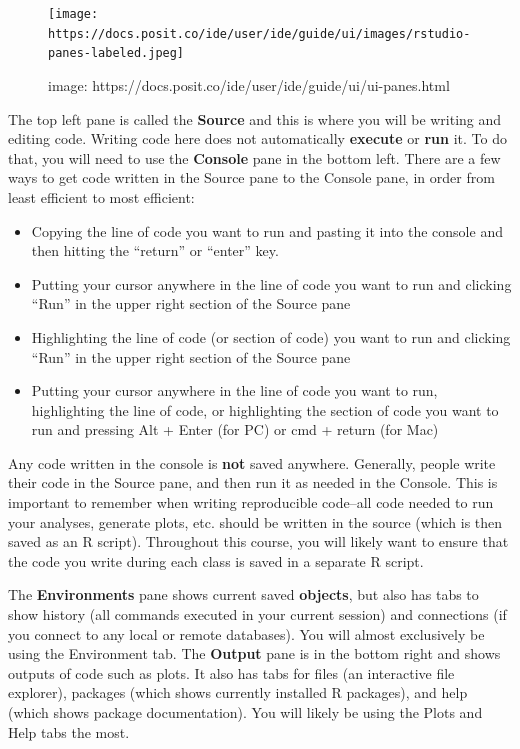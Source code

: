 \documentclass[
  letterpaper,
  DIV=11,
  numbers=noendperiod]{scrreprt}
\begin{document}
\begin{figure}

{\centering \texttt{[image: https://docs.posit.co/ide/user/ide/guide/ui/images/rstudio-panes-labeled.jpeg]}

}

\caption{image:
https://docs.posit.co/ide/user/ide/guide/ui/ui-panes.html}

\end{figure}

The top left pane is called the \textbf{Source} and this is where you
will be writing and editing code. Writing code here does not
automatically \textbf{execute} or \textbf{run} it. To do that, you will
need to use the \textbf{Console} pane in the bottom left. There are a
few ways to get code written in the Source pane to the Console pane, in
order from least efficient to most efficient:

\begin{itemize}
\item
  Copying the line of code you want to run and pasting it into the
  console and then hitting the ``return'' or ``enter'' key.
\item
  Putting your cursor anywhere in the line of code you want to run and
  clicking ``Run'' in the upper right section of the Source pane
\item
  Highlighting the line of code (or section of code) you want to run and
  clicking ``Run'' in the upper right section of the Source pane
\item
  Putting your cursor anywhere in the line of code you want to run,
  highlighting the line of code, or highlighting the section of code you
  want to run and pressing Alt + Enter (for PC) or cmd + return (for
  Mac)
\end{itemize}

Any code written in the console is \textbf{not} saved anywhere.
Generally, people write their code in the Source pane, and then run it
as needed in the Console. This is important to remember when writing
reproducible code--all code needed to run your analyses, generate plots,
etc. should be written in the source (which is then saved as an R
script). Throughout this course, you will likely want to ensure that the
code you write during each class is saved in a separate R script.

The \textbf{Environments} pane shows current saved \textbf{objects}, but
also has tabs to show history (all commands executed in your current
session) and connections (if you connect to any local or remote
databases). You will almost exclusively be using the Environment tab.
The \textbf{Output} pane is in the bottom right and shows outputs of
code such as plots. It also has tabs for files (an interactive file
explorer), packages (which shows currently installed R packages), and
help (which shows package documentation). You will likely be using the
Plots and Help tabs the most.
\end{document}
